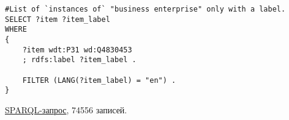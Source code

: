 \begin{lstlisting}[language=SPARQL,label=nameless,caption={Список организаций, у которых указано имя в Викиданных на английском языке}]
#List of `instances of` "business enterprise" only with a label.
SELECT ?item ?item_label
WHERE
{
    ?item wdt:P31 wd:Q4830453
    ; rdfs:label ?item_label . 

    FILTER (LANG(?item_label) = "en") . 
}
\end{lstlisting}

\href{https://query.wikidata.org/#SELECT%20%3Fitem%20%3Fitem_label%0AWHERE%0A%7B%0A%20%20%20%20%3Fitem%20wdt%3AP31%20wd%3AQ4830453%0A%20%20%20%20%3B%20rdfs%3Alabel%20%3Fitem_label%20.%20%0A%0A%20%20%20%20FILTER%20%28LANG%28%3Fitem_label%29%20%3D%20%22en%22%29%20.%20%0A%7D}{SPARQL-запрос}, 74556 записей.
